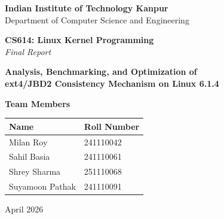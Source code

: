 \documentclass[12pt,a4paper]{article}
\begin{document}
\begin{titlepage}
    \centering

    \vspace*{1.5cm}

    {\Large \textbf{Indian Institute of Technology Kanpur}}\\[0.6em]
    {\normalsize Department of Computer Science and Engineering}

    \vspace{2.5cm}

    {\large \textbf{CS614: Linux Kernel Programming}}\\[0.6em]
    {\normalsize \textit{Final Report}}

    \vspace{2.5cm}

    {\LARGE \textbf{Analysis, Benchmarking, and Optimization of}}\\[0.4em]
    {\LARGE \textbf{ext4/JBD2 Consistency Mechanism on Linux 6.1.4}}

    \vspace{3cm}

    {\large \textbf{Team Members}}\\[0.8em]
    \begin{tabular}{ll}
        \toprule
        \textbf{Name} & \textbf{Roll Number} \\
        \midrule
        Milan Roy        & 241110042 \\
        Sahil Basia      & 241110061 \\
        Shrey Sharma     & 251110068 \\
        Suyamoon Pathak  & 241110091 \\
        \bottomrule
    \end{tabular}

    \vfill

    {\normalsize April 2026}

    \vspace{1cm}

\end{titlepage}
\end{document}
